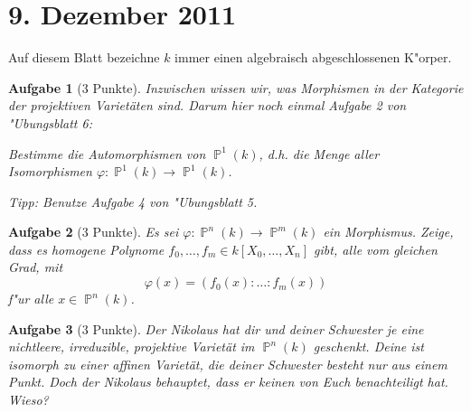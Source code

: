 \documentclass[a4paper, 12pt, numbers=noendperiod, chapterprefix=true]{scrbook}
\theoremstyle{break}
\newtheorem{Aufg}{Aufgabe}
\theoremstyle{nonumberbreak}
\theoremstyle{nonumberplain}
\newcommand{\A}{\mathbb{A}}
\DeclareMathOperator{\Projective}{\mathbb{P}} %
\begin{document}
\newpage
\section{9. Dezember 2011}
\setcounter{Aufg}{0}
\setcounter{Loes}{0}

Auf diesem Blatt bezeichne $k$ immer einen algebraisch abgeschlossenen K"orper.

\begin{Aufg}[3 Punkte]
Inzwischen wissen wir, was Morphismen in der Kategorie der projektiven Variet\"aten sind. Darum hier noch einmal Aufgabe 2 von "Ubungsblatt 6:

Bestimme die Automorphismen von $\Projective^1(k)$, d.h. die Menge aller Isomorphismen $\varphi \colon \Projective^1(k) \to \Projective^1(k)$.

\textit{Tipp:} Benutze Aufgabe 4 von "Ubungsblatt 5.
\end{Aufg}

\begin{Aufg}[3 Punkte]
Es sei $\varphi: \Projective^n(k)\to \Projective^m(k)$ ein Morphismus. Zeige, dass es homogene Polynome $f_0,\dots,f_m\in k[X_0,\dots,X_n]$ gibt, alle vom gleichen Grad, mit
	\[\varphi(x) = (f_0(x):\ldots :f_m(x))\]
f"ur alle $x\in \Projective^n(k)$.
\end{Aufg}

\begin{Aufg}[3 Punkte]
Der Nikolaus hat dir und deiner Schwester je eine nichtleere, irreduzible, projektive Variet\"at im $\Projective^n(k)$ geschenkt. Deine ist isomorph zu einer affinen Variet\"at, die deiner Schwester besteht nur aus einem Punkt. Doch der Nikolaus behauptet, dass er keinen von Euch benachteiligt hat. Wieso?
\end{Aufg}
\end{document}
